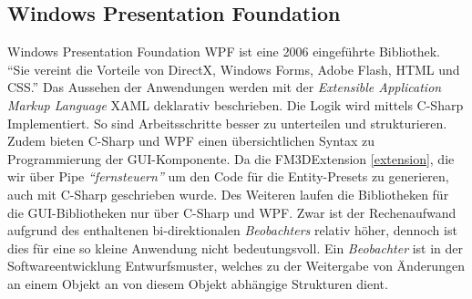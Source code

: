 \subsection{Windows Presentation Foundation}
\label{wpf}

Windows Presentation Foundation \ac{WPF} ist eine 2006 eingeführte Bibliothek. \cite{wikipedia_wpf} "`Sie vereint die Vorteile von DirectX, Windows Forms, Adobe Flash, HTML und CSS."'\cite{eiwpf} 
Das Aussehen der Anwendungen werden mit der \textit{Extensible Application Markup Language} \ac{XAML} deklarativ beschrieben. Die Logik wird mittels C-Sharp Implementiert. So sind Arbeitsschritte besser zu unterteilen und strukturieren. Zudem bieten C-Sharp und WPF einen übersichtlichen Syntax zu Programmierung der GUI-Komponente. 
Da die FM3DExtension \ref{extension}, die wir über Pipe \textit{"`fernsteuern"'} um den Code für die Entity-Presets %
zu generieren, auch mit C-Sharp geschrieben wurde. Des Weiteren laufen die Bibliotheken für die GUI-Bibliotheken nur über C-Sharp und WPF. Zwar ist der Rechenaufwand aufgrund des enthaltenen bi-direktionalen \textit{Beobachters} relativ höher, dennoch ist dies für eine so kleine Anwendung nicht bedeutungsvoll. Ein \textit{Beobachter} ist in der Softwareentwicklung Entwurfsmuster, welches zu der Weitergabe von Änderungen an einem Objekt an von diesem Objekt abhängige Strukturen dient.